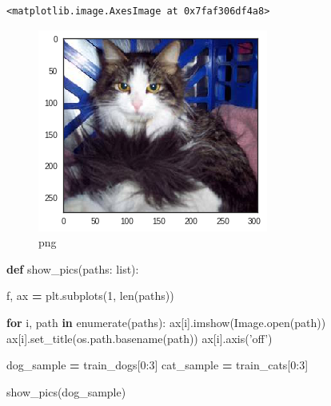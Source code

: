 \documentclass[]{book}
\newenvironment{Shaded}{\begin{snugshade}}{\end{snugshade}}
\newcommand{\KeywordTok}[1]{\textcolor[rgb]{0.13,0.29,0.53}{\textbf{#1}}}
\newcommand{\DecValTok}[1]{\textcolor[rgb]{0.00,0.00,0.81}{#1}}
\newcommand{\StringTok}[1]{\textcolor[rgb]{0.31,0.60,0.02}{#1}}
\newcommand{\ControlFlowTok}[1]{\textcolor[rgb]{0.13,0.29,0.53}{\textbf{#1}}}
\newcommand{\OperatorTok}[1]{\textcolor[rgb]{0.81,0.36,0.00}{\textbf{#1}}}
\newcommand{\BuiltInTok}[1]{#1}
\newcommand{\NormalTok}[1]{#1}
\theoremstyle{definition}
\theoremstyle{definition}
\theoremstyle{definition}
\theoremstyle{remark}
\begin{document}
\begin{verbatim}
<matplotlib.image.AxesImage at 0x7faf306df4a8>
\end{verbatim}

\begin{figure}
\centering
\includegraphics{CNTK-Transfer-Cats-Dogs_files/CNTK-Transfer-Cats-Dogs_34_1.png}
\caption{png}
\end{figure}

\begin{Shaded}
\begin{Highlighting}[]
\KeywordTok{def}\NormalTok{ show_pics(paths: }\BuiltInTok{list}\NormalTok{):}
    
\NormalTok{    f, ax }\OperatorTok{=}\NormalTok{ plt.subplots(}\DecValTok{1}\NormalTok{, }\BuiltInTok{len}\NormalTok{(paths))}
    
    \ControlFlowTok{for}\NormalTok{ i, path }\KeywordTok{in} \BuiltInTok{enumerate}\NormalTok{(paths):}
\NormalTok{        ax[i].imshow(Image.}\BuiltInTok{open}\NormalTok{(path))}
\NormalTok{        ax[i].set_title(os.path.basename(path))}
\NormalTok{        ax[i].axis(}\StringTok{'off'}\NormalTok{)}
\end{Highlighting}
\end{Shaded}

\begin{Shaded}
\begin{Highlighting}[]
\NormalTok{dog_sample }\OperatorTok{=}\NormalTok{ train_dogs[}\DecValTok{0}\NormalTok{:}\DecValTok{3}\NormalTok{]}
\NormalTok{cat_sample }\OperatorTok{=}\NormalTok{ train_cats[}\DecValTok{0}\NormalTok{:}\DecValTok{3}\NormalTok{]}
\end{Highlighting}
\end{Shaded}

\begin{Shaded}
\begin{Highlighting}[]
\NormalTok{show_pics(dog_sample)}
\end{Highlighting}
\end{Shaded}
\end{document}
